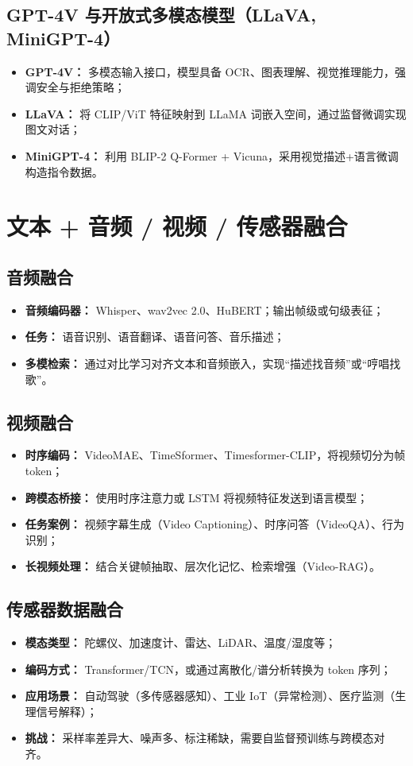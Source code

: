 \documentclass[UTF8,zihao=-4]{ctexart}
\begin{document}
\subsection{GPT-4V 与开放式多模态模型（LLaVA, MiniGPT-4）}
\begin{itemize}
  \item \textbf{GPT-4V：} 多模态输入接口，模型具备 OCR、图表理解、视觉推理能力，强调安全与拒绝策略；
  \item \textbf{LLaVA：} 将 CLIP/ViT 特征映射到 LLaMA 词嵌入空间，通过监督微调实现图文对话；
  \item \textbf{MiniGPT-4：} 利用 BLIP-2 Q-Former + Vicuna，采用视觉描述+语言微调构造指令数据。
\end{itemize}

\section{文本 + 音频 / 视频 / 传感器融合}
\subsection{音频融合}
\begin{itemize}
  \item \textbf{音频编码器：} Whisper、wav2vec 2.0、HuBERT；输出帧级或句级表征；
  \item \textbf{任务：} 语音识别、语音翻译、语音问答、音乐描述；
  \item \textbf{多模检索：} 通过对比学习对齐文本和音频嵌入，实现“描述找音频”或“哼唱找歌”。
\end{itemize}

\subsection{视频融合}
\begin{itemize}
  \item \textbf{时序编码：} VideoMAE、TimeSformer、Timesformer-CLIP，将视频切分为帧 token；
  \item \textbf{跨模态桥接：} 使用时序注意力或 LSTM 将视频特征发送到语言模型；
  \item \textbf{任务案例：} 视频字幕生成（Video Captioning）、时序问答（VideoQA）、行为识别；
  \item \textbf{长视频处理：} 结合关键帧抽取、层次化记忆、检索增强（Video-RAG）。
\end{itemize}

\subsection{传感器数据融合}
\begin{itemize}
  \item \textbf{模态类型：} 陀螺仪、加速度计、雷达、LiDAR、温度/湿度等；
  \item \textbf{编码方式：} Transformer/TCN，或通过离散化/谱分析转换为 token 序列；
  \item \textbf{应用场景：} 自动驾驶（多传感器感知）、工业 IoT（异常检测）、医疗监测（生理信号解释）；
  \item \textbf{挑战：} 采样率差异大、噪声多、标注稀缺，需要自监督预训练与跨模态对齐。
\end{itemize}
\end{document}
